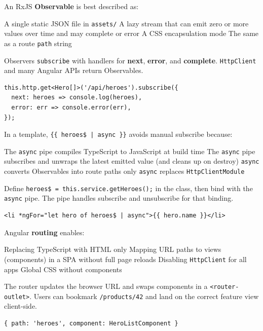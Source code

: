 \question[4]
An RxJS \textbf{Observable} is best described as:
\begin{choices}
  \choice A single static JSON file in \lstinline[style=tsinline]|assets/|
  \CorrectChoice A lazy stream that can emit zero or more values over time and may complete or error
  \choice A CSS encapsulation mode
  \choice The same as a route \lstinline[style=tsinline]|path| string
\end{choices}
\begin{solution}
  Observers \lstinline[style=tsinline]|subscribe| with handlers for \textbf{next}, \textbf{error}, and \textbf{complete}. \lstinline[style=tsinline]|HttpClient| and many Angular APIs return Observables.
\begin{lstlisting}[style=ts]
this.http.get<Hero[]>('/api/heroes').subscribe({
  next: heroes => console.log(heroes),
  error: err => console.error(err),
});
\end{lstlisting}
\end{solution}



\newpage




\question[4]
In a template, \lstinline[style=htmlinline]!{{ heroes$ | async }}! avoids manual subscribe because:
\begin{choices}
  \choice The \lstinline[style=htmlinline]|async| pipe compiles TypeScript to JavaScript at build time
  \CorrectChoice The \lstinline[style=htmlinline]|async| pipe subscribes and unwraps the latest emitted value (and cleans up on destroy)
  \choice \lstinline[style=htmlinline]|async| converts Observables into route paths only
  \choice \lstinline[style=htmlinline]|async| replaces \lstinline[style=tsinline]|HttpClientModule|
\end{choices}
\begin{solution}
  Define \lstinline[style=tsinline]|heroes$ = this.service.getHeroes();| in the class, then bind with the \lstinline[style=htmlinline]|async| pipe. The pipe handles subscribe and unsubscribe for that binding.
\begin{lstlisting}[style=htmlinline]
<li *ngFor="let hero of heroes$ | async">{{ hero.name }}</li>
\end{lstlisting}
\end{solution}

\question[4]
Angular \textbf{routing} enables:
\begin{choices}
  \choice Replacing TypeScript with HTML only
  \CorrectChoice Mapping URL paths to views (components) in a SPA without full page reloads
  \choice Disabling \lstinline[style=tsinline]|HttpClient| for all apps
  \choice Global CSS without components
\end{choices}
\begin{solution}
  The router updates the browser URL and swaps components in a \lstinline[style=htmlinline]|<router-outlet>|. Users can bookmark \texttt{/products/42} and land on the correct feature view client-side.
\begin{lstlisting}[style=ts]
{ path: 'heroes', component: HeroListComponent }
\end{lstlisting}
\end{solution}

